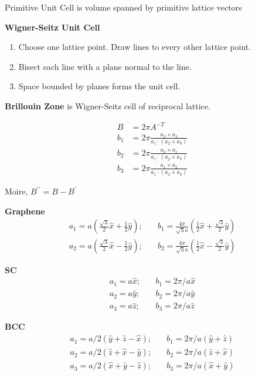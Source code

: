 \documentclass[12pt]{article}
\begin{document}
\begin{multicols}{2}
Primitive Unit Cell is volume spanned by primitive lattice vectors

\noindent
\textbf{Wigner-Seitz Unit Cell}
\begin{enumerate}
  \item Choose one lattice point. Draw lines to every other lattice point.
  \item Bisect each line with a plane normal to the line.
  \item Space bounded by planes forms the unit cell.
\end{enumerate}

\noindent
\textbf{Brillouin Zone} is Wigner-Seitz cell of reciprocal lattice.

\begin{align}
  B &= 2\pi A^{-T}\\
  b_{1} &= 2\pi \frac{a_2 \times a_3}{a_1 \cdot (a_2 \times a_3)}\\
  b_{2} &= 2\pi \frac{a_3 \times a_1}{a_1 \cdot (a_2 \times a_3)}\\
  b_{3} &= 2\pi \frac{a_1 \times a_2}{a_1 \cdot (a_2 \times a_3)}
\end{align}

Moire, $B^{\prime\prime} = B - B^{\prime}$

\noindent
\textbf{Graphene}
\begin{align}
  a_1 = a (\frac{\sqrt{3}}{2}\hat{x} + \frac{1}{2}\hat{y});
  &\quad b_1 = \frac{4\pi}{\sqrt{3}a}(\frac{1}{2}\hat{x} + \frac{\sqrt{3}}{2}\hat{y})\\
  a_2 = a (\frac{\sqrt{3}}{2}\hat{x} - \frac{1}{2}\hat{y});
  &\quad b_2 = \frac{4\pi}{\sqrt{3}a}(\frac{1}{2}\hat{x} - \frac{\sqrt{3}}{2}\hat{y})
\end{align}

\noindent
\textbf{SC}
\begin{align}
  a_1 = a\hat{x}; &\quad b_1 = 2\pi/a \hat{x}\\
  a_2 = a\hat{y}; &\quad b_2 = 2\pi/a\hat{y}\\
  a_3 = a\hat{z}; &\quad b_3 = 2\pi/a\hat{z}
\end{align}

\noindent
\textbf{BCC}
\begin{align}
  a_1 = a/2(\hat{y} + \hat{z} - \hat{x}); &\quad b_1 = 2\pi/a(\hat{y} + \hat{z})\\
  a_2 = a/2(\hat{z} + \hat{x} - \hat{y}); &\quad b_2 = 2\pi/a(\hat{z} + \hat{x})\\
  a_3 = a/2(\hat{x} + \hat{y} - \hat{z}); &\quad b_3 = 2\pi/a(\hat{x} + \hat{y})
\end{align}


\end{multicols}
\end{document}
